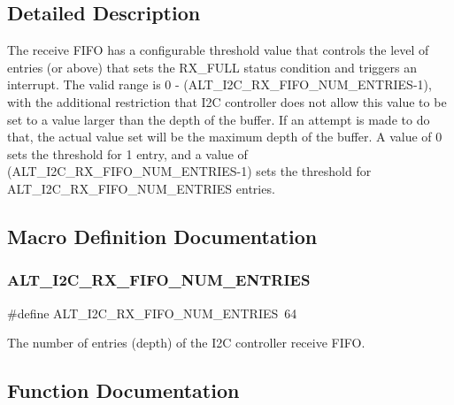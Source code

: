 \subsection{Detailed Description}
The receive F\+I\+FO has a configurable threshold value that controls the level of entries (or above) that sets the R\+X\+\_\+\+F\+U\+LL status condition and triggers an interrupt. The valid range is 0 -\/ (A\+L\+T\+\_\+\+I2\+C\+\_\+\+R\+X\+\_\+\+F\+I\+F\+O\+\_\+\+N\+U\+M\+\_\+\+E\+N\+T\+R\+I\+E\+S-\/1), with the additional restriction that I2C controller does not allow this value to be set to a value larger than the depth of the buffer. If an attempt is made to do that, the actual value set will be the maximum depth of the buffer. A value of 0 sets the threshold for 1 entry, and a value of (A\+L\+T\+\_\+\+I2\+C\+\_\+\+R\+X\+\_\+\+F\+I\+F\+O\+\_\+\+N\+U\+M\+\_\+\+E\+N\+T\+R\+I\+E\+S-\/1) sets the threshold for A\+L\+T\+\_\+\+I2\+C\+\_\+\+R\+X\+\_\+\+F\+I\+F\+O\+\_\+\+N\+U\+M\+\_\+\+E\+N\+T\+R\+I\+ES entries. 

\subsection{Macro Definition Documentation}
\mbox{\label{group__ALT__I2C__RX__FIFO_gadb12fe09bcba46e29befd79e08bd7541}} 
\subsubsection{\texorpdfstring{ALT\_I2C\_RX\_FIFO\_NUM\_ENTRIES}{ALT\_I2C\_RX\_FIFO\_NUM\_ENTRIES}}
{\footnotesize\ttfamily \#define A\+L\+T\+\_\+\+I2\+C\+\_\+\+R\+X\+\_\+\+F\+I\+F\+O\+\_\+\+N\+U\+M\+\_\+\+E\+N\+T\+R\+I\+ES~64}

The number of entries (depth) of the I2C controller receive F\+I\+FO. 

\subsection{Function Documentation}
\mbox{\label{group__ALT__I2C__RX__FIFO_gacfc0421dad98b6fbd6abfba07c059d3d}} 
